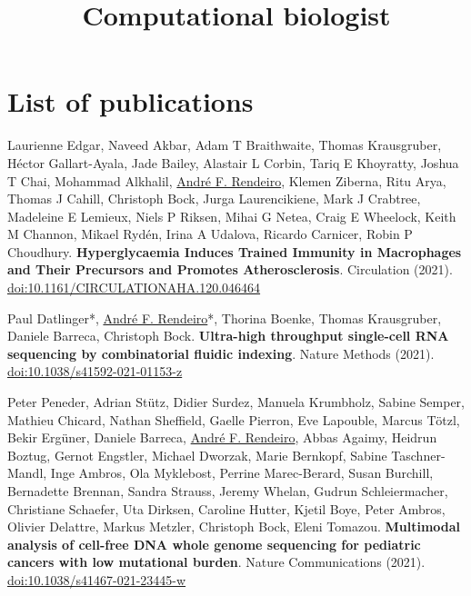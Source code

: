 \documentclass[11pt,a4paper,roman]{moderncv} %
\title{Computational biologist}
\begin{document}
\makecvtitle %


\section{List of publications}
        \begin{etaremune}[leftmargin=1.0cm, itemindent=0pt, topsep=10pt, itemsep=2pt, partopsep=0pt, parsep=0pt]

        \item Laurienne Edgar, Naveed Akbar, Adam T Braithwaite, Thomas Krausgruber, Héctor Gallart-Ayala, Jade Bailey, Alastair L Corbin, Tariq E Khoyratty, Joshua T Chai, Mohammad Alkhalil, \underline{André F. Rendeiro}, Klemen Ziberna, Ritu Arya, Thomas J Cahill, Christoph Bock, Jurga Laurencikiene, Mark J Crabtree, Madeleine E Lemieux, Niels P Riksen, Mihai G Netea, Craig E Wheelock, Keith M Channon, Mikael Rydén, Irina A Udalova, Ricardo Carnicer, Robin P Choudhury. \textbf{Hyperglycaemia Induces Trained Immunity in Macrophages and Their Precursors and Promotes Atherosclerosis}. Circulation (2021).
        \href{https://dx.doi.org/10.1161/CIRCULATIONAHA.120.046464}{doi:10.1161/CIRCULATIONAHA.120.046464}

        \item Paul Datlinger*, \underline{André F. Rendeiro}*, Thorina Boenke, Thomas Krausgruber, Daniele Barreca, Christoph Bock. \textbf{Ultra-high throughput single-cell RNA sequencing by combinatorial fluidic indexing}. Nature Methods (2021).
        \href{https://dx.doi.org/10.1038/s41592-021-01153-z}{doi:10.1038/s41592-021-01153-z}

        \item Peter Peneder, Adrian Stütz, Didier Surdez, Manuela Krumbholz, Sabine Semper, Mathieu Chicard, Nathan Sheffield, Gaelle Pierron, Eve Lapouble, Marcus Tötzl, Bekir Ergüner, Daniele Barreca, \underline{André F. Rendeiro}, Abbas Agaimy, Heidrun Boztug, Gernot Engstler, Michael Dworzak, Marie Bernkopf, Sabine Taschner-Mandl, Inge Ambros, Ola Myklebost, Perrine Marec-Berard, Susan Burchill, Bernadette Brennan, Sandra Strauss, Jeremy Whelan, Gudrun Schleiermacher, Christiane Schaefer, Uta Dirksen, Caroline Hutter, Kjetil Boye, Peter Ambros, Olivier Delattre, Markus Metzler, Christoph Bock, Eleni Tomazou. \textbf{Multimodal analysis of cell-free DNA whole genome sequencing for pediatric cancers with low mutational burden}. Nature Communications (2021).
        \href{https://dx.doi.org/10.1038/s41467-021-23445-w}{doi:10.1038/s41467-021-23445-w}


\end{etaremune}
\end{document}
